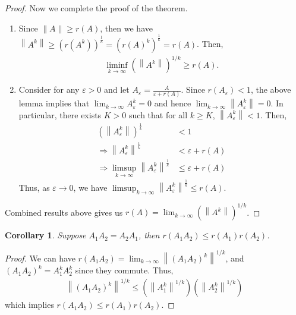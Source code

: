 \documentclass[11pt]{book}
\newtheorem{corollary}{Corollary}[theorem]
\theoremstyle{definition}
\numberwithin{equation}{chapter}
\begin{document}
\begin{proof}
Now we complete the proof of the theorem.
\begin{enumerate}[label=(\alph*)]
    \item Since $\|A\|\geq r(A)$, then we have $\left\|A^k\right\| \geq \left(r\left(A^k\right) \right)^{\frac{1}{k}} = \left(r(A)^k \right)^{\frac{1}{k}}  = r(A)$. Then,
    \begin{align*}
        \liminf_{k\to\infty} \left(\left\|A^k\right\|\right)^{1/k} \geq r(A).
    \end{align*}
    \item Consider for any $\varepsilon > 0$ and let $A_\varepsilon = \frac{A}{\varepsilon + r(A)}$. Since $r(A_\varepsilon) < 1$, the above lemma implies that $\lim_{k\to\infty}A_\varepsilon^k = 0$ and hence $\lim_{k\to\infty}\left\|A_\varepsilon^k\right\| = 0$. In particular, there exists $K > 0$ such that for all $k \geq K$, $\left\|A_\varepsilon^k\right\| < 1$. Then, 
    \begin{align*}
        \left(\left\|A_\varepsilon^k\right\| \right)^{\frac{1}{k}} & < 1 \\
        \Rightarrow \left\|A_\varepsilon^k\right\|^{\frac{1}{k}} & < \varepsilon + r(A) \\
        \Rightarrow \limsup_{k\to\infty} \left\|A_\varepsilon^k\right\|^{\frac{1}{k}} & \leq \varepsilon + r(A)
    \end{align*}
    Thus, as $\varepsilon \to 0$, we have $\limsup_{k\to\infty} \left\|A_\varepsilon^k\right\|^{\frac{1}{k}} \leq r(A)$.
\end{enumerate}
Combined results above gives us $r(A) = \lim_{k\to\infty} \left(\left\|A^k\right\|\right)^{1/k}$.
\end{proof}

\medskip

\begin{corollary}
Suppose $A_1 A_2 = A_2 A_1$, then $r(A_1 A_2) \leq r(A_1) r(A_2)$.
\end{corollary}
\begin{proof}
We can have $r(A_1 A_2) = \lim_{k\to\infty} \left\|(A_1 A_2)^k\right\|^{1/k}$, and $(A_1 A_2)^k = A_1^k A_2^k$ since they commute. Thus, 
\begin{align*}
    \left\|(A_1 A_2)^k\right\|^{1/k} \leq \left(\left\|A_1^k\right\|^{1/k} \right) \left(\left\|A_2^k\right\|^{1/k} \right)
\end{align*}
which implies $r(A_1 A_2) \leq r(A_1) r(A_2)$.
\end{proof}
\end{document}
